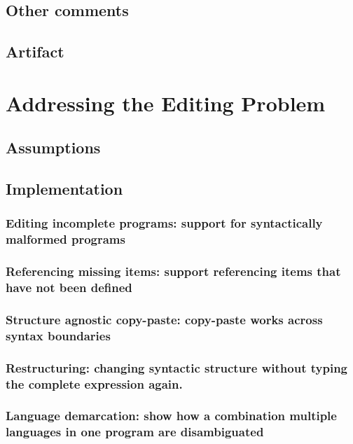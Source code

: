 \documentclass[preprint,numbers,10pt]{sigplanconf}
\begin{document}
\subsection{Other comments}

\subsection{Artifact}

%
%

\section{Addressing the Editing Problem}

\subsection{Assumptions}

\subsection{Implementation}

\subsubsection{Editing incomplete programs: support for syntactically malformed programs}
\subsubsection{Referencing missing items: support referencing items that have not been defined}
\subsubsection{Structure agnostic copy-paste: copy-paste works across syntax boundaries}
\subsubsection{Restructuring: changing syntactic structure without typing the complete expression again.}
\subsubsection{Language demarcation: show how a combination multiple languages in one program are disambiguated}
\end{document}
